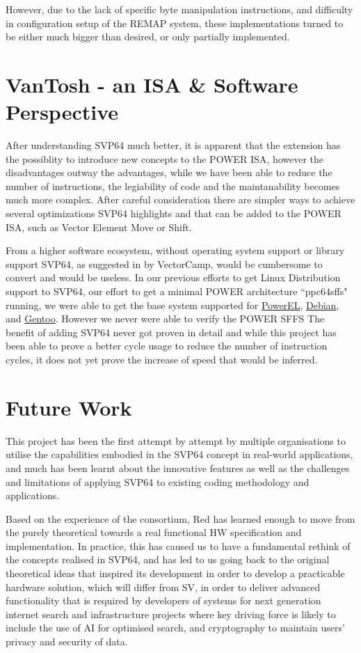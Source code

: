 However, due to the lack of specific byte manipulation instructions, and
difficulty in configuration setup of the REMAP system, these implementations
turned to be either much bigger than desired, or only partially implemented.


\section{VanTosh -  an ISA \& Software Perspective}

After understanding SVP64 much better, it is apparent that the extension has
the possiblity to introduce new concepts to the \acrshort{POWER} \acrshort{ISA},
however the disadvantages outway the advantages, while we have been able to
reduce the number of instructions, the legiability of code and the maintanability
becomes much more complex.
After careful consideration there are simpler ways to achieve several optimizations
SVP64 highlights and that can be added to the \acrshort{POWER} \acrshort{ISA},
such as Vector Element Move or Shift.

From a higher software ecosystem, without operating system support or library support
SVP64, as suggested in \label{sec:vecotorscansoftwareperspective} by VectorCamp,
would be cumbersome to convert and would be useless.
In our previous efforts to get Linux Distribution support to SVP64, our effort to
get a minimal \acrshort{POWER} architecture ``ppc64sffs" running, we were able
to get the base system supported for \href{https://www.powerel.org}{PowerEL},
\href{https://www.debian.org}{Debian}, and \href{https://gentoo.org}{Gentoo}.
However we never were able to verify the \acrshort{POWER} \acrfull{SFFS}
The benefit of adding SVP64 never got proven in detail and while this project
has been able to prove a better cycle usage to reduce the number of instruction
cycles, it does not yet prove the increase of speed that would be inferred.

\section{Future Work}

This project has been the first attempt by attempt by multiple organisations
to utilise the capabilities embodied in the SVP64 concept in real-world
applications, and much has been learnt about the innovative features as well
as the challenges and limitations of applying SVP64 to existing
coding methodology and applications.

Based on the experience of the consortium, Red has learned enough to move from
the purely theoretical towards a real functional HW specification
and implementation.
In practice, this has caused us to have a fundamental rethink of the concepts
realised in SVP64, and has led to us going back to the original theoretical
ideas that inspired its development in order to develop a practicable hardware
solution, which will differ from \acrshort{SV}, in order to deliver
advanced functionality that is required by developers of systems for next
generation internet search and infrastructure projects where key driving force
is likely to include the use of AI for optimised search, and cryptography to
maintain users' privacy and security of data.

